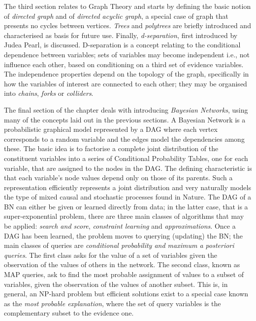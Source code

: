 The third section relates to Graph Theory and starts by defining the basic notion of \textit{directed graph} and of \textit{directed acyclic graph}, a special case of graph that presents no cycles between vertices.
\textit{Trees} and \textit{polytrees} are briefly introduced and characterised as basis for future use.
Finally, \textit{d-separation}, first introduced by Judea Pearl, is discussed.
D-separation is a concept relating to the conditional dependence between variables; sets of variables may become independent i.e., not influence each other, based on conditioning on a third set of evidence variables.
The independence properties depend on the topology of the graph, specifically in how the variables of interest are connected to each other; they may be organised into \textit{chains}, \textit{forks} or \textit{colliders}.

The final section of the chapter deals with introducing \textit{Bayesian Networks}, using many of the concepts laid out in the previous sections.
A Bayesian Network is a probabilistic graphical model represented by a DAG where each vertex corresponds to a random variable and the edges model the dependencies among these.
The basic idea is to factorise a complete joint distribution of the constituent variables into a series of Conditional Probability Tables, one for each variable, that are assigned to the nodes in the DAG.
The defining characteristic is that each variable's node values depend only on those of its parents.
Such a representation efficiently represents a joint distribution and very naturally models the type of mixed causal and stochastic processes found in Nature.
The DAG of a BN can either be given or learned directly from data; in the latter case, that is a super-exponential problem, there are three main classes of algorithms that may be applied: \textit{search and score}, \textit{constraint learning} and \textit{approximations}.
Once a DAG has been learned, the problem moves to querying (updating) the BN; the main classes of queries are \textit{conditional probability and maximum a posteriori queries}.
The first class asks for the value of a set of variables given the observation of the values of others in the network.
The second class, known as MAP queries, ask to find the most probable assignment of values to a subset of variables, given the observation of the values of another subset.
This is, in general, an NP-hard problem but efficient solutions exist to a special case known as the \textit{most probable explanation}, where the set of query variables is the complementary subset to the evidence one.